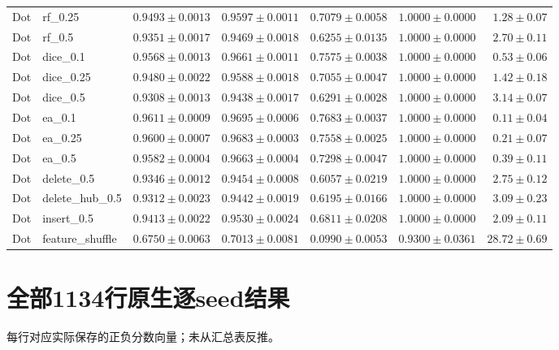 \documentclass[UTF8,a4paper,11pt,fontset=fandol]{ctexart}
\begin{document}
{\begin{longtable}{llrrrrr}
Dot & rf\_0.25 & $0.9493\pm0.0013$ & $0.9597\pm0.0011$ & $0.7079\pm0.0058$ & $1.0000\pm0.0000$ & $1.28\pm0.07$ \\
Dot & rf\_0.5 & $0.9351\pm0.0017$ & $0.9469\pm0.0018$ & $0.6255\pm0.0135$ & $1.0000\pm0.0000$ & $2.70\pm0.11$ \\
Dot & dice\_0.1 & $0.9568\pm0.0013$ & $0.9661\pm0.0011$ & $0.7575\pm0.0038$ & $1.0000\pm0.0000$ & $0.53\pm0.06$ \\
Dot & dice\_0.25 & $0.9480\pm0.0022$ & $0.9588\pm0.0018$ & $0.7055\pm0.0047$ & $1.0000\pm0.0000$ & $1.42\pm0.18$ \\
Dot & dice\_0.5 & $0.9308\pm0.0013$ & $0.9438\pm0.0017$ & $0.6291\pm0.0028$ & $1.0000\pm0.0000$ & $3.14\pm0.07$ \\
Dot & ea\_0.1 & $0.9611\pm0.0009$ & $0.9695\pm0.0006$ & $0.7683\pm0.0037$ & $1.0000\pm0.0000$ & $0.11\pm0.04$ \\
Dot & ea\_0.25 & $0.9600\pm0.0007$ & $0.9683\pm0.0003$ & $0.7558\pm0.0025$ & $1.0000\pm0.0000$ & $0.21\pm0.07$ \\
Dot & ea\_0.5 & $0.9582\pm0.0004$ & $0.9663\pm0.0004$ & $0.7298\pm0.0047$ & $1.0000\pm0.0000$ & $0.39\pm0.11$ \\
Dot & delete\_0.5 & $0.9346\pm0.0012$ & $0.9454\pm0.0008$ & $0.6057\pm0.0219$ & $1.0000\pm0.0000$ & $2.75\pm0.12$ \\
Dot & delete\_hub\_0.5 & $0.9312\pm0.0023$ & $0.9442\pm0.0019$ & $0.6195\pm0.0166$ & $1.0000\pm0.0000$ & $3.09\pm0.23$ \\
Dot & insert\_0.5 & $0.9413\pm0.0022$ & $0.9530\pm0.0024$ & $0.6811\pm0.0208$ & $1.0000\pm0.0000$ & $2.09\pm0.11$ \\
Dot & feature\_shuffle & $0.6750\pm0.0063$ & $0.7013\pm0.0081$ & $0.0990\pm0.0053$ & $0.9300\pm0.0361$ & $28.72\pm0.69$ \\
\end{longtable}
}
\clearpage\section{全部1134行原生逐seed结果}
每行对应实际保存的正负分数向量；未从汇总表反推。
\end{document}
